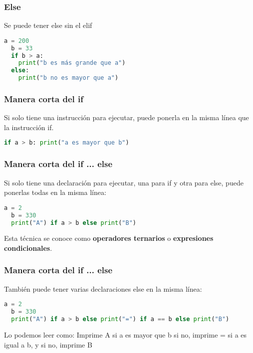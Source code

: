\begin{frame}[fragile]
  \frametitle{Else}

  Se puede tener \textcolor{codeKeyword}{else} sin el
  \textcolor{codeKeyword}{elif}

  \vspace{\baselineskip}
  \begin{lstlisting}[language=Python]
  a = 200
  b = 33
  if b > a:
    print("b es más grande que a")
  else:
    print("b no es mayor que a")
  \end{lstlisting}
\end{frame}

\begin{frame}[fragile]
  \frametitle{Manera corta del if}

  Si solo tiene una instrucción para ejecutar, puede ponerla en la misma
  línea que la instrucción if.

  \vspace{\baselineskip}
  \begin{lstlisting}[language=Python]
  if a > b: print("a es mayor que b")
  \end{lstlisting}
\end{frame}

\begin{frame}[fragile]
  \frametitle{Manera corta del if ... else}

  Si solo tiene una declaración para ejecutar, una para if y otra para
  else, puede ponerlas todas en la misma línea:

  \vspace{\baselineskip}
  \begin{lstlisting}[language=Python]
  a = 2
  b = 330
  print("A") if a > b else print("B")
  \end{lstlisting}

  \vspace{\baselineskip}
  \begin{exampleblock}{}
    Esta técnica se conoce como \textbf{operadores ternarios} o
    \textbf{expresiones condicionales}.
  \end{exampleblock}
\end{frame}

\begin{frame}[fragile]
  \frametitle{Manera corta del if ... else}

  También puede tener varias declaraciones else en la misma línea:

  \vspace{\baselineskip}
  \begin{lstlisting}[language=Python]
  a = 2
  b = 330
  print("A") if a > b else print("=") if a == b else print("B")
  \end{lstlisting}

  \vspace{\baselineskip}
  \begin{block}{Lo podemos leer como:}
    Imprime A si a es mayor que b si no, imprime = si a es igual a b, y si
    no, imprime B
  \end{block}
\end{frame}

